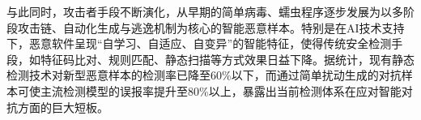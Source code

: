 


与此同时，攻击者手段不断演化，从早期的简单病毒、蠕虫程序逐步发展为以多阶段攻击链、自动化生成与逃逸机制为核心的智能恶意样本。特别是在AI技术支持下，恶意软件呈现“自学习、自适应、自变异”的智能特征，使得传统安全检测手段，如特征码比对、规则匹配、静态扫描等方式效果日益下降\cite{chen2018study, ren2021matching, lipp2022empirical}。据统计，现有静态检测技术对新型恶意样本的检测率已降至60\%以下，而通过简单扰动生成的对抗样本可使主流检测模型的误报率提升至80\%以上，暴露出当前检测体系在应对智能对抗方面的巨大短板。

